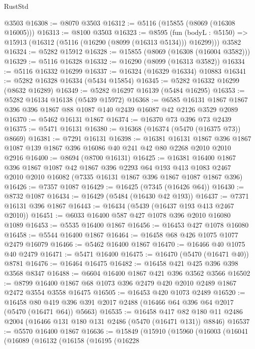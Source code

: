 \begin{lexlean}{RustStd}
\begin{coremodule}
    @3503
@16308 := @8070 @3503
@16312 := @5116 (@15855 (@8069 (@16308 @16005)))
@16313 := @8100 @3503
@16323 := @8595
    (fun (bodyL : @5150) => @15913 (@16312 (@5116 (@16290 (@8099 (@16313 @5134))) @16299)))
    @3582
@16324 := @5282 @15912
@16328 := @15855 (@8069 (@16308 (@16004 @3582)))
@16329 := @5116 @16328
@16332 := @16290 (@8099 (@16313 @3582))
@16334 := @5116 @16332 @16299
@16337 := @16324 (@16329 @16334) @10883
@16341 := @5282 @16328 @16334 (@5434 @15854)
@16345 := @5282 @16332 @16299 (@8632 @16289)
@16349 := @5282 @16297 @16139 (@5484 @16295)
@16353 := @5282 @16134 @16138 (@5439 @15972)
@16368 := @6585 @16131 @1867 @1867 @396 @396 @1867 @88 @1087 @140 @2439 @16087 @42 @2126 @3529 @2089
@16370 := @5462 @16131 @1867
@16374 := @16370 @73 @396 @73 @2439
@16375 := @5471 @16131
@16380 := @16368 (@16374 (@5470 (@16375 @73)) @8669)
@16381 := @7291 @16131
@16398 := @16381
    @16131
    @1867
    @396
    @1867
    @1087
    @139
    @1867
    @396
    @16086
    @40
    @241
    @42
    @80
    @2268
    @2010
    @2010
    @2916
@16400 := @8694 (@8700 @16131)
@16425 := @16381
    @16400
    @1867
    @396
    @1867
    @1087
    @42
    @1867
    @396
    @2293
    @64
    @193
    @413
    @1083
    @2467
    @2010
    @2010
    @16082
    (@7335 @16131 @1867 @396 @1867 @1087 @1867 @396)
@16426 := @7357 @1087
@16429 := @16425 (@7345 (@16426 @64))
@16430 := @8732 @1087
@16434 := @16429 (@5484 (@16430 @42 @193))
@16437 := @7371 @16131 @396 @1867
@16443 := @16434 (@5439 (@16437 @193 @413 @2467 @2010))
@16451 := @6033 @16400 @587 @427 @1078 @396 @2010 @16080 @1089
@16453 := @5535 @16400 @1867
@16456 := @16453 @427 @1078 @16080
@16458 := @5544 @16400 @1867
@16464 := @16458 @68 @426 @1075 @1077 @2479 @16079
@16466 := @5462 @16400 @1867
@16470 := @16466 @40 @1075 @40 @2479
@16471 := @5471 @16400
@16475 := @16470 (@5470 (@16471 @40)) @8781
@16476 := @16464 @16475
@16482 := @16458 @421 @425 @396 @398 @3568 @8347
@16488 := @6604 @16400 @1867 @421 @396 @3562 @3566
@16502 := @8799 @16400 @1867 @68 @1073 @396 @2479 @420 @2010 @2489 @1867 @2472 @3554 @3558 @16475
@16505 := @16453 @420 @1073 @2489
@16520 := @16458
    @80
    @419
    @396
    @391
    @2017
    @2488
    (@16466 @64 @396 @64 @2017 (@5470 (@16471 @64)) @5663)
@16535 := @16458
    @417
    @82
    @180
    @11
    @2486
    @2004
    (@16466 @131 @180 @131 @2486 (@5470 (@16471 @131)) @8846)
@16537 := @5570 @16400 @1867
@16636 := @15849
    (@15910
      (@15960
        (@16003
          (@16041
            (@16089
              (@16132
                (@16158
                  (@16195
                    (@16228

\end{coremodule}
\end{lexlean}

